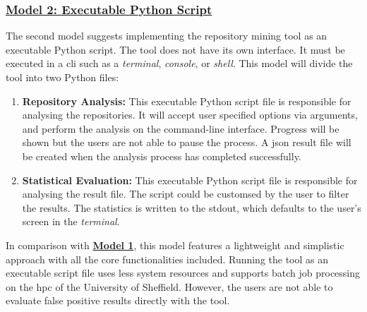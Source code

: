 \documentclass[12pt, a4paper]{report}
\begin{document}
\subsubsection*{\underline{Model 2: Executable Python Script}}\label{subsec:model2}
The second model suggests implementing the repository mining tool as an executable Python script.
The tool does not have its own interface. It must be executed in a \acrfull{cli} such as a
\textit{terminal}, \textit{console}, or \textit{shell}. This model will divide the tool into two
Python files:
\begin{enumerate}
  \item \textbf{Repository Analysis:} This executable Python script file is responsible for
  analysing the repositories. It will accept user specified options via arguments, and perform the
  analysis on the command-line interface. Progress will be shown but the users are not able to pause
  the process. A \acrshort{json} result file will be created when the analysis process has completed
  successfully.
  \item \textbf{Statistical Evaluation:} This executable Python script file is responsible for
  analysing the result file. The script could be customsed by the user to filter the results. The
  statistics is written to the \acrfull{stdout}, which defaults to the user's screen in the
  \textit{terminal}.
\end{enumerate}

In comparison with \hyperref[subsec:model1]{\textbf{Model 1}}, this model features a lightweight and
simplistic approach with all the core functionalities included. Running the tool as an executable
script file uses less system resources and supports batch job processing on the \acrshort{hpc} of
the University of Sheffield. However, the users are not able to evaluate false positive results
directly with the tool.
\end{document}
